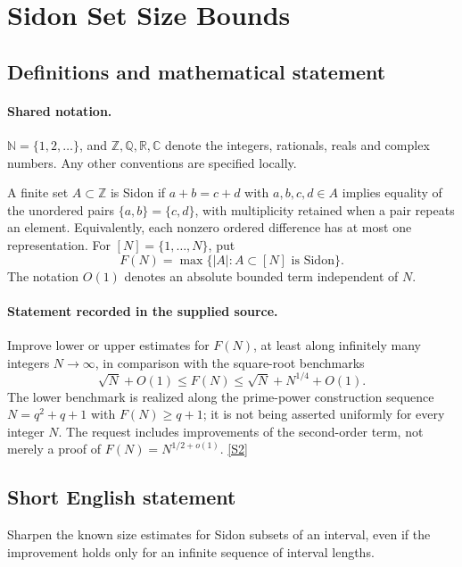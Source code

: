 \documentclass[11pt]{article}
\newcommand{\sref}[2]{\hyperlink{source:#1:#2}{[S#2]}}
\begin{document}
\section{Sidon Set Size Bounds}\label{statement}

\subsection{Definitions and mathematical statement}

\paragraph{Shared notation.}$\mathbb N=\{1,2,\ldots\}$, and $\mathbb Z,\mathbb Q,\mathbb R,\mathbb C$ denote the integers, rationals, reals and complex numbers. Any other conventions are specified locally.


A finite set $A\subset\mathbb Z$ is Sidon if $a+b=c+d$ with $a,b,c,d\in A$ implies equality of the unordered pairs $\{a,b\}=\{c,d\}$, with multiplicity retained when a pair repeats an element. Equivalently, each nonzero ordered difference has at most one representation. For $[N]=\{1,\ldots,N\}$, put
\[
 F(N)=\max\{|A|:A\subset[N]\text{ is Sidon}\}.
\]
The notation $O(1)$ denotes an absolute bounded term independent of $N$.
\paragraph{Statement recorded in the supplied source.}
Improve lower or upper estimates for $F(N)$, at least along infinitely many integers $N\to\infty$, in comparison with the square-root benchmarks
\[
 \sqrt N+O(1)\leq F(N)\leq\sqrt N+N^{1/4}+O(1).
\]
The lower benchmark is realized along the prime-power construction sequence $N=q^2+q+1$ with $F(N)\geq q+1$; it is not being asserted uniformly for every integer $N$. The request includes improvements of the second-order term, not merely a proof of $F(N)=N^{1/2+o(1)}$. \sref{statement}{2}
\subsection{Short English statement}
Sharpen the known size estimates for Sidon subsets of an interval, even if the improvement holds only for an infinite sequence of interval lengths.
\end{document}
